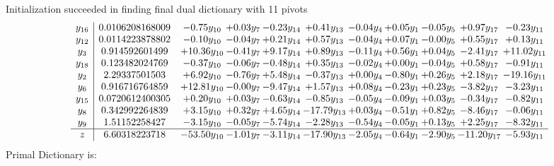 \documentclass[9pt]{article}
\begin{document}
Initialization succeeded in finding final dual dictionary with 11 pivots
\[\begin{array}{c| c c@{\hskip 2pt} c@{\hskip 2pt} c@{\hskip 2pt} c@{\hskip 2pt} c@{\hskip 2pt} c@{\hskip 2pt} c@{\hskip 2pt} c@{\hskip 2pt} c@{\hskip 2pt} }
 y_{16}   &  0.0106208168009 & -0.75 y_{10} & +  0.03 y_{7} & -0.23 y_{14} & +  0.41 y_{13} & -0.04 y_{4} & +  0.05 y_{1} & -0.05 y_{5} & +  0.97 y_{17} & -0.23 y_{11}\\
 y_{12}   &  0.0114223878802 & -0.10 y_{10} & -0.04 y_{7} & +  0.21 y_{14} & +  0.57 y_{13} & -0.04 y_{4} & +  0.07 y_{1} & -0.00 y_{5} & +  0.55 y_{17} & +  0.13 y_{11}\\
 y_{3}   &  0.914592601499 & + 10.36 y_{10} & -0.41 y_{7} & +  9.17 y_{14} & +  0.89 y_{13} & -0.11 y_{4} & +  0.56 y_{1} & +  0.04 y_{5} & -2.41 y_{17} & + 11.02 y_{11}\\
 y_{18}   &  0.123482024769 & -0.37 y_{10} & -0.06 y_{7} & -0.48 y_{14} & +  0.35 y_{13} & -0.02 y_{4} & +  0.00 y_{1} & -0.04 y_{5} & +  0.58 y_{17} & -0.91 y_{11}\\
 y_{2}   &  2.29337501503 & +  6.92 y_{10} & -0.76 y_{7} & +  5.48 y_{14} & -0.37 y_{13} & +  0.00 y_{4} & -0.80 y_{1} & +  0.26 y_{5} & +  2.18 y_{17} & -19.16 y_{11}\\
 y_{6}   &  0.916716764859 & + 12.81 y_{10} & -0.00 y_{7} & -9.47 y_{14} & +  1.57 y_{13} & +  0.08 y_{4} & -0.23 y_{1} & +  0.23 y_{5} & -3.82 y_{17} & -3.23 y_{11}\\
 y_{15}   &  0.0720612400305 & +  0.20 y_{10} & +  0.03 y_{7} & -0.63 y_{14} & -0.85 y_{13} & -0.05 y_{4} & -0.09 y_{1} & +  0.03 y_{5} & -0.34 y_{17} & -0.82 y_{11}\\
 y_{8}   &  0.342992264839 & +  3.15 y_{10} & +  0.32 y_{7} & +  4.65 y_{14} & -17.79 y_{13} & +  0.03 y_{4} & -0.51 y_{1} & +  0.82 y_{5} & -8.46 y_{17} & -0.06 y_{11}\\
 y_{9}   &  1.51152258427 & -3.15 y_{10} & -0.05 y_{7} & -5.74 y_{14} & -2.28 y_{13} & -0.54 y_{4} & -0.05 y_{1} & +  0.13 y_{5} & +  2.25 y_{17} & -8.32 y_{11}\\
\hline
z    &  6.60318223718 & -53.50 y_{10} & -1.01 y_{7} & -3.11 y_{14} & -17.90 y_{13} & -2.05 y_{4} & -0.64 y_{1} & -2.90 y_{5} & -11.20 y_{17} & -5.93 y_{11}\\
\end{array}\]
Primal Dictionary is:
\end{document}

